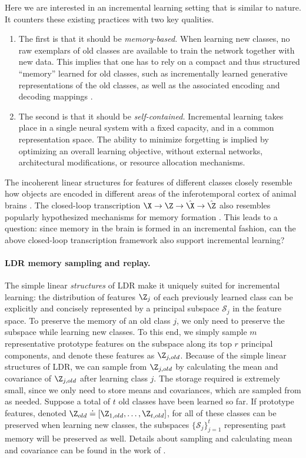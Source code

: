\documentclass[../../book-main.tex]{subfiles}
\begin{document}
Here we are interested in an incremental learning setting that is
similar to nature. It counters these existing practices with two key qualities.
\begin{enumerate}
    \item The first is that it should be \emph{memory-based.} When
        learning new classes, no raw exemplars of old classes are
        available to train the network together with new data. This
        implies that one has to rely on a compact and thus structured
        ``memory'' learned for old classes, such as incrementally
        learned generative representations of the old classes, as
        well as the associated encoding and decoding mappings \cite{fearnet}.
    \item The second is that it should be \emph{self-contained.}
        Incremental learning takes place in a single neural system
        with a fixed capacity, and in a common representation space.
        The ability to minimize forgetting is implied by optimizing
        an overall learning objective, without external networks,
        architectural modifications, or resource allocation mechanisms.
\end{enumerate}

The incoherent linear structures for features of different classes
closely resemble how objects are encoded in different areas of the
inferotemporal cortex of animal brains
\cite{Chang-Cell-2017,Bao2020AMO}. The closed-loop transcription $\X
\rightarrow \Z \rightarrow \hat{\X} \rightarrow \hat{\Z}$ also
resembles popularly hypothesized mechanisms for memory formation
\cite{2020Vandeven,Josselyn2020MemoryER}. This leads to a question:
since memory in the brain is formed in an incremental fashion, can
the above closed-loop transcription framework also support incremental learning?

\paragraph{LDR memory sampling and replay.} The simple linear {\em
structures} of LDR make it uniquely suited for incremental learning:
the distribution of features $\Z_j$ of each previously learned class
can be explicitly and concisely represented by a principal subspace
$\mathcal{S}_j$ in the feature space. To preserve the memory of an
old class $j$, we only need to preserve the subspace while learning
new classes. To this end, we simply sample $m$ representative
prototype features on the subspace along its top $r$ principal
components, and denote these features as $\Z_{j,old}$. Because of the
simple linear structures of LDR, we can sample from $\Z_{j,old}$ by
calculating the mean and covariance of $\Z_{j,old}$ after learning
class $j$. The storage required is extremely small, since we only
need to store means and covariances, which are sampled from as
needed. Suppose a total of $t$ old classes have been learned so far.
If prototype features, denoted $\Z_{old} \doteq [\Z_{1,old},\ldots,
\Z_{t,old}]$, for all of these classes can be preserved when learning
new classes, the subspaces $\{\mathcal{S}_j\}_{j=1}^t$ representing
past memory will be preserved as well. Details about sampling and
calculating mean and covariance can be found in the work of
\cite{tong2023incremental}.
\end{document}
